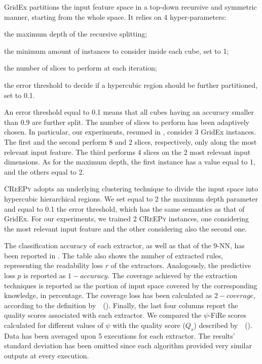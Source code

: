 \documentclass{article}
\newcommand{\citet}[1]{\citeauthor{#1}~(\citeyear{#1})}
\newcommand{\gridex}{GridEx}
\newcommand{\creepy}{\textsc{CReEPy}}
\newcommand{\fire}{FiRe}
\newcommand{\psifire}{$\psi$-\fire}
\newenvironment{inlinelist}{\begin{enumerate*}[label=\emph{(\roman{*})}]}{\end{enumerate*}}
\begin{document}
\gridex{} partitions the input feature space in a top-down recursive and symmetric manner, starting from the whole space.
%
It relies on 4 hyper-parameters:
%
\begin{inlinelist}
	\item the maximum depth of the recursive splitting;
	\item the minimum amount of instances to consider inside each cube, set to 1;
	\item the number of slices to perform at each iteration;
	\item the error threshold to decide if a hypercubic region should be further partitioned, set to 0.1.
\end{inlinelist}
%
An error threshold equal to 0.1 means that all cubes having an accuracy smaller than 0.9 are further split.
%
The number of slices to perform has been adaptively chosen.
%
In particular, our experiments, resumed in , consider 3 \gridex{} instances.
%
The first and the second perform 8 and 2 slices, respectively, only along the most relevant input feature.
%
The third performs 4 slices on the 2 most relevant input dimensions.
%
As for the maximum depth, the first instance has a value equal to 1, and the others equal to 2.

\creepy{} adopts an underlying clustering technique to divide the input space into hypercubic hierarchical regions.
%
We set equal to 2 the maximum depth parameter and equal to 0.1 the error threshold, which has the same semantics as that of \gridex{}.
%
For our experiments, we trained 2 \creepy{} instances, one considering the most relevant input feature and the other considering also the second one.

The classification accuracy of each extractor, as well as that of the 9-NN, has been reported in .
%
The table also shows the number of extracted rules, representing the readability loss $r$ of the extractors.
%
Analogously, the predictive loss $p$ is reported as $1-accuracy$.
%
The coverage achieved by the extraction techniques is reported as the portion of input space covered by the corresponding knowledge, in percentage.
%
The coverage loss has been calculated as $2-coverage$, according to the definition by~\citet{skemetrics-aaai2023}.
%
Finally, the last four columns report the quality scores associated with each extractor.
%
We compared the \psifire{} scores calculated for different values of $\psi$ with the quality score ($Q_s$) described by~\citet{skemetrics-aaai2023}.
%
Data has been averaged upon 5 executions for each extractor.
%
The results' standard deviation has been omitted since each algorithm provided very similar outputs at every execution.
\end{document}

